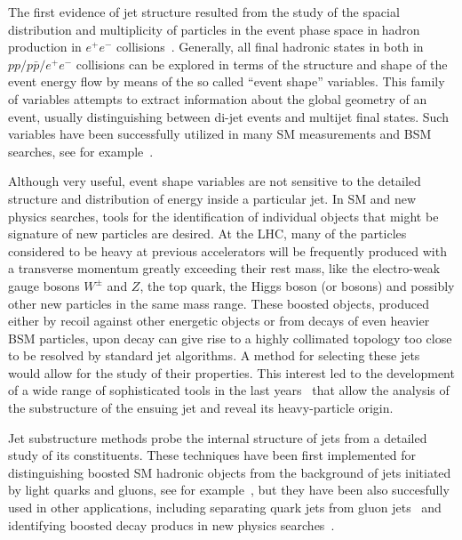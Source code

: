 The first evidence of jet structure resulted from the study of the spacial distribution and multiplicity of particles in the event phase space in hadron production in $e^+ e^-$ collisions~\cite{PhysRevLett.35.1609}.
Generally, all final hadronic states in both in $pp/p\bar{p}/e^+e^-$ collisions can be explored in terms of the structure and shape of the event energy flow by means of the so called ``event shape'' variables. This family of variables attempts to extract information about the global geometry of an event, usually distinguishing between di-jet events and multijet final states. Such variables have been successfully utilized in many SM measurements and BSM searches, see for example~\cite{Abbiendi:2007aa}\cite{Aad:2012np}. 

Although very useful, event shape variables are not sensitive to the detailed structure and distribution of energy inside a particular jet. In SM and new physics searches, tools for the identification of individual objects that might be signature of new particles are desired. 
At the LHC, many of the particles considered to be heavy at previous accelerators will be frequently produced with a transverse momentum greatly exceeding their rest mass, like the electro-weak gauge bosons $W^\pm$ and $Z$, the top quark, the Higgs boson (or bosons) and possibly other new particles in the same mass range. These boosted objects, produced either by recoil against other energetic objects or from decays of even heavier BSM particles, upon decay can give rise to a highly collimated topology too close to be resolved by standard jet algorithms. 
A method for selecting these jets would allow for the study of their properties.   This interest led to the development of a wide range of %
sophisticated tools in the last years~\cite{boost2010,boost2010b} that allow the analysis of the substructure of the ensuing jet and reveal its heavy-particle origin.

  Jet substructure methods probe the internal structure of jets from a detailed study of its constituents. These techniques have been first implemented for distinguishing boosted SM hadronic objects from the background of jets initiated by light quarks and gluons, see for example~\cite{ATLASBoostedHbb},
but they have been also succesfully used in other applications, including separating quark jets from gluon jets~\cite{PhysRevLett.107.172001} and identifying boosted decay producs in new physics searches~\cite{PhysRevD.82.095012}.

